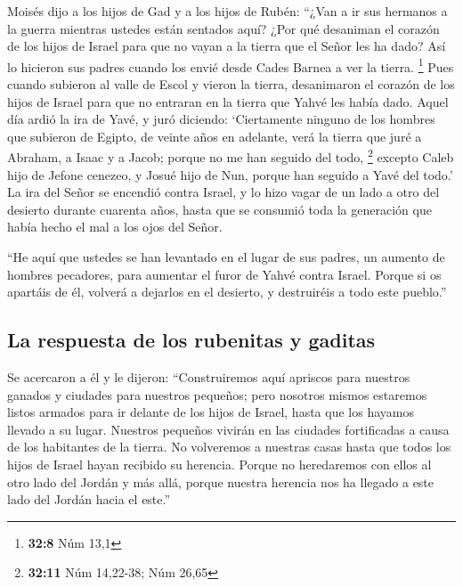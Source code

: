 \begin{paracol}{2}
 Moisés dijo a los hijos de Gad y a los hijos de Rubén:
``¿Van a ir sus hermanos a la guerra mientras ustedes están sentados
aquí?  ¿Por qué desaniman el corazón de los hijos de
Israel para que no vayan a la tierra que el Señor les ha dado?
 Así lo hicieron sus padres cuando los envié desde Cades
Barnea a ver la tierra. \footnote{\textbf{32:8} Núm 13,1} 
Pues cuando subieron al valle de Escol y vieron la tierra, desanimaron
el corazón de los hijos de Israel para que no entraran en la tierra que
Yahvé les había dado.  Aquel día ardió la ira de Yavé, y
juró diciendo:  `Ciertamente ninguno de los hombres que
subieron de Egipto, de veinte años en adelante, verá la tierra que juré
a Abraham, a Isaac y a Jacob; porque no me han seguido del todo,
\footnote{\textbf{32:11} Núm 14,22-38; Núm 26,65} 
excepto Caleb hijo de Jefone cenezeo, y Josué hijo de Nun, porque han
seguido a Yavé del todo.'  La ira del Señor se encendió
contra Israel, y lo hizo vagar de un lado a otro del desierto durante
cuarenta años, hasta que se consumió toda la generación que había hecho
el mal a los ojos del Señor.

 ``He aquí que ustedes se han levantado en el lugar de
sus padres, un aumento de hombres pecadores, para aumentar el furor de
Yahvé contra Israel.  Porque si os apartáis de él,
volverá a dejarlos en el desierto, y destruiréis a todo este pueblo.''

\hypertarget{la-respuesta-de-los-rubenitas-y-gaditas}{%
\subsection{La respuesta de los rubenitas y
gaditas}\label{la-respuesta-de-los-rubenitas-y-gaditas}}

 Se acercaron a él y le dijeron: ``Construiremos aquí
apriscos para nuestros ganados y ciudades para nuestros pequeños;
 pero nosotros mismos estaremos listos armados para ir
delante de los hijos de Israel, hasta que los hayamos llevado a su
lugar. Nuestros pequeños vivirán en las ciudades fortificadas a causa de
los habitantes de la tierra.  No volveremos a nuestras
casas hasta que todos los hijos de Israel hayan recibido su herencia.
 Porque no heredaremos con ellos al otro lado del Jordán
y más allá, porque nuestra herencia nos ha llegado a este lado del
Jordán hacia el este.''


\end{paracol}
